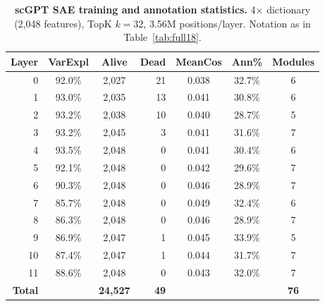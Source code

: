 \documentclass[onecolumn]{article}
\begin{document}
\begin{table}[t]
\centering
\caption{\textbf{scGPT SAE training and annotation statistics.} 4$\times$ dictionary (2,048 features), TopK $k{=}32$, 3.56M positions/layer. Notation as in Table~\ref{tab:full18}.}
\label{tab:scgpt_full12}
\smallskip
\begin{tabular}{rccrccc}
\toprule
Layer & VarExpl & Alive & Dead & MeanCos & Ann\% & Modules \\
\midrule
0  & 92.0\% & 2,027 & 21 & 0.038 & 32.7\% & 6 \\
1  & 93.0\% & 2,035 & 13 & 0.041 & 30.8\% & 6 \\
2  & 93.2\% & 2,038 & 10 & 0.040 & 28.7\% & 5 \\
3  & 93.2\% & 2,045 & 3  & 0.041 & 31.6\% & 7 \\
4  & 93.5\% & 2,048 & 0  & 0.041 & 30.4\% & 6 \\
5  & 92.1\% & 2,048 & 0  & 0.042 & 29.6\% & 7 \\
6  & 90.3\% & 2,048 & 0  & 0.046 & 28.9\% & 7 \\
7  & 85.7\% & 2,048 & 0  & 0.049 & 32.4\% & 6 \\
8  & 86.3\% & 2,048 & 0  & 0.046 & 28.9\% & 7 \\
9  & 86.9\% & 2,047 & 1  & 0.045 & 33.9\% & 5 \\
10 & 87.4\% & 2,047 & 1  & 0.044 & 31.7\% & 7 \\
11 & 88.6\% & 2,048 & 0  & 0.043 & 32.0\% & 7 \\
\midrule
\textbf{Total} & & \textbf{24,527} & \textbf{49} & & & \textbf{76} \\
\bottomrule
\end{tabular}
\end{table}
\end{document}
